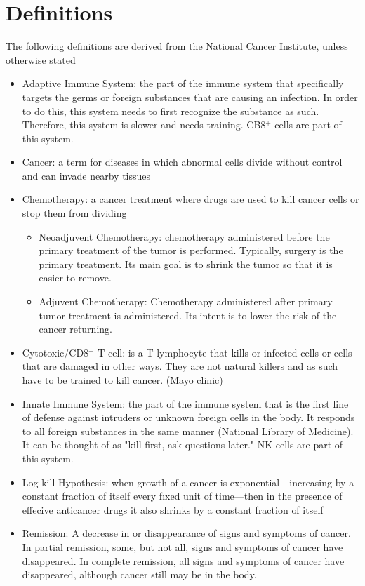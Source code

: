 \documentclass[11pt]{amsart}
\begin{document}
\section{Definitions}
\label{appendix: defs}
The following definitions are derived from the National Cancer Institute, unless otherwise stated
\begin{itemize}
	\item Adaptive Immune System: the part of the immune system that specifically targets the germs or foreign substances that are causing an infection. In order to do this, this system needs to first recognize the substance as such. Therefore, this system is slower and needs training. CB8$^+$ cells are part of this system.
	\item Cancer:  a term for diseases in which abnormal cells divide without control and can invade nearby tissues
	\item Chemotherapy: a cancer treatment where drugs are used to kill cancer cells or stop them from dividing
		\begin{itemize}
			\item Neoadjuvent Chemotherapy: chemotherapy administered before the primary treatment of the tumor is performed. Typically, surgery is the primary treatment. Its main goal is to shrink the tumor so that it is easier to remove.
			\item Adjuvent Chemotherapy: Chemotherapy administered after primary tumor treatment is administered. Its intent is to lower the risk of the cancer returning.
		\end{itemize}
	\item Cytotoxic/CD8$^+$ T-cell: is a T-lymphocyte that kills or infected cells or cells that are damaged in other ways. They are not natural killers and as such have to be trained to kill cancer. (Mayo clinic)
	\item Innate Immune System: the part of the immune system that is the first line of defense against intruders or unknown foreign cells in the body. It responds to all foreign substances in the same manner (National Library of Medicine). It can be thought of as "kill first, ask questions later." NK cells are part of this system.
	\item Log-kill Hypothesis: when growth of a cancer is exponential—increasing by a constant fraction of itself every fıxed unit of time—then in the presence of effecive anticancer drugs it also shrinks by a constant fraction \cite{LogKill}
of itself
	\item Remission: A decrease in or disappearance of signs and symptoms of cancer. In partial remission, some, but not all, signs and symptoms of cancer have disappeared. In complete remission, all signs and symptoms of cancer have disappeared, although cancer still may be in the body.

\end{itemize}
\end{document}
